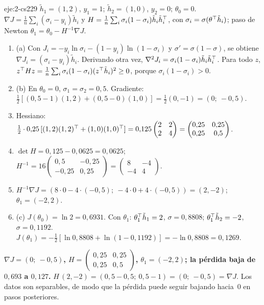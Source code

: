 \begin{solucion}{eje:2-cs229}
\datos $\tilde h_1=(1,2)$, $y_1=1$; $\tilde h_2=(1,0)$, $y_2=0$; $\theta_0=0$.
\planteamiento $\nabla J=\frac1n\sum_i(\sigma_i-y_i)\tilde h_i$ y $H=\frac1n\sum_i\sigma_i(1-\sigma_i)\tilde h_i\tilde h_i^{\top}$, con $\sigma_i=\sigma(\theta^{\top}\tilde h_i)$; paso de Newton $\theta_1=\theta_0-H^{-1}\nabla J$.
\pasos
\begin{enumerate}[label=\arabic*.]
  \item (a) Con $J_i=-y_i\ln\sigma_i-(1-y_i)\ln(1-\sigma_i)$ y $\sigma'=\sigma(1-\sigma)$, se obtiene $\nabla J_i=(\sigma_i-y_i)\tilde h_i$. Derivando otra vez, $\nabla^{2}J_i=\sigma_i(1-\sigma_i)\tilde h_i\tilde h_i^{\top}$. Para todo $z$, $z^{\top} Hz=\frac1n\sum_i\sigma_i(1-\sigma_i)(z^{\top}\tilde h_i)^{2}\ge 0$, porque $\sigma_i(1-\sigma_i)>0$.
  \item (b) En $\theta_0=0$, $\sigma_1=\sigma_2=0{,}5$. Gradiente: $\tfrac12[(0{,}5-1)(1,2)+(0{,}5-0)(1,0)]=\tfrac12(0,-1)=(0;\allowbreak\ -0{,}5)$.
  \item Hessiano: $\tfrac12\cdot 0{,}25\,[(1,2)(1,2)^{\top}+(1,0)(1,0)^{\top}]=0{,}125\begin{pmatrix}2&2\\2&4\end{pmatrix}=\begin{pmatrix}0{,}25&0{,}25\\0{,}25&0{,}5\end{pmatrix}$.
  \item $\det H=0{,}125-0{,}0625=0{,}0625$; $H^{-1}=16\begin{pmatrix}0{,}5&-0{,}25\\-0{,}25&0{,}25\end{pmatrix}=\begin{pmatrix}8&-4\\-4&4\end{pmatrix}$.
  \item $H^{-1}\nabla J=(8\cdot 0-4\cdot(-0{,}5);\allowbreak\ -4\cdot 0+4\cdot(-0{,}5))=(2,-2)$; $\theta_1=(-2,2)$.
  \item (c) $J(\theta_0)=\ln 2=0{,}6931$. Con $\theta_1$: $\theta_1^{\top}\tilde h_1=2$, $\sigma=0{,}8808$; $\theta_1^{\top}\tilde h_2=-2$, $\sigma=0{,}1192$. $J(\theta_1)=-\tfrac12[\ln 0{,}8808+\ln(1-0{,}1192)]=-\ln 0{,}8808=0{,}1269$.
\end{enumerate}
\resultado \textbf{$\nabla J=(0;\allowbreak\ -0{,}5)$, $H=\begin{pmatrix}0{,}25&0{,}25\\0{,}25&0{,}5\end{pmatrix}$, $\theta_1=(-2,2)$; la pérdida baja de $0{,}693$ a $0{,}127$.}
\comprobacion $H\,(2,-2)=(0{,}5-0{,}5;\allowbreak\ 0{,}5-1)=(0;\allowbreak\ -0{,}5)=\nabla J$. Los datos son separables, de modo que la pérdida puede seguir bajando hacia~0 en pasos posteriores.
\end{solucion}


